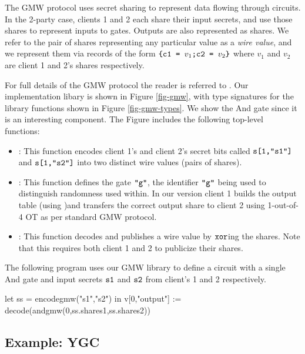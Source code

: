 The GMW protocol uses secret sharing to represent data flowing through
circuits. In the 2-party case, clients 1 and 2 each share their input
secrets, and use those shares to represent inputs to gates. Outputs
are also represented as shares. We refer to the pair of shares
representing any particular value as a \emph{wire value}, and
we represent them via records of the form
$
\texttt{\{c1 = } v_1\texttt{;c2 = } v_2\texttt{\}} 
$
where $v_1$ and $v_2$ are client 1 and 2's shares respectively.

For full details of the GMW protocol the reader is referred to
\cite{evans2018pragmatic}. Our implementation libary is shown in
Figure \ref{fig-gmw}, with type signatures for the library functions
shown in Figure \ref{fig-gmw-types}. We show the And gate since it is
an interesting component. The Figure includes the
following top-level functions:
\begin{itemize}
\item {}: This function encodes client 1's and client 2's
  secret bits called $\texttt{s[1,"s1"]}$ and $\texttt{s[1,"s2"]}$ into two
  distinct wire values (pairs of shares).
\item {}: This function defines the gate $\texttt{"g"}$, the
  identifier $\texttt{"g"}$ being used to distinguish randomness used
  within.  In our version client 1 builds the output table (using
  )and transfers the correct output share to client 2
  using 1-out-of-4 OT as per standard GMW protocol.
\item {}: This function decodes and publishes a wire value
  by $\texttt{xor}$ing the shares. Note that this requires both client 1
  and 2 to publicize their shares.
\end{itemize}
\begin{example}
  \label{example-gmw-andcircuit}
The following program uses our GMW library to define
a circuit with a single And gate and input secrets $\texttt{s1}$ and
$\texttt{s2}$ from client's 1 and 2 respectively. 
{\small
  \begin{verbatimtab}
  let ss = encodegmw("s1","s2") in v[0,"output"] := decode(andgmw(0,ss.shares1,ss.shares2)) \end{verbatimtab}
}
\end{example}

\subsection{Example: YGC}
\label{section-metalang-ygc}


